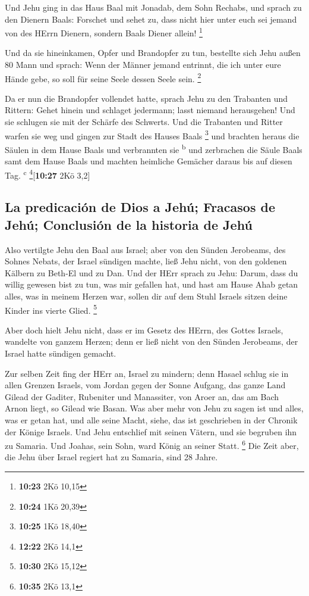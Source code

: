  Und Jehu ging in das Haus Baal mit Jonadab, dem Sohn
Rechabs, und sprach zu den Dienern Baals: Forschet und sehet zu, dass
nicht hier unter euch sei jemand von des HErrn Dienern, sondern Baals
Diener allein! \footnote{\textbf{10:23} 2Kö 10,15}

 Und da sie hineinkamen, Opfer und Brandopfer zu tun,
bestellte sich Jehu außen 80 Mann und sprach: Wenn der Männer jemand
entrinnt, die ich unter eure Hände gebe, so soll für seine Seele dessen
Seele sein. \footnote{\textbf{10:24} 1Kö 20,39}

 Da er nun die Brandopfer vollendet hatte, sprach Jehu zu
den Trabanten und Rittern: Gehet hinein und schlaget jedermann; lasst
niemand herausgehen! Und sie schlugen sie mit der Schärfe des Schwerts.
Und die Trabanten und Ritter warfen sie weg und gingen zur Stadt des
Hauses Baals \footnote{\textbf{10:25} 1Kö 18,40}  und
brachten heraus die Säulen in dem Hause Baals und verbrannten sie
\textsuperscript{b}  und zerbrachen die Säule Baals samt
dem Hause Baals und machten heimliche Gemächer daraus bis auf diesen
Tag. \textsuperscript{c} \footnote{\textbf{12:22} 2Kö 14,1}{[}\textbf{10:27}
2Kö 3,2{]}

\hypertarget{la-predicaciuxf3n-de-dios-a-jehuxfa-fracasos-de-jehuxfa-conclusiuxf3n-de-la-historia-de-jehuxfa}{%
\subsection{La predicación de Dios a Jehú; Fracasos de Jehú; Conclusión
de la historia de
Jehú}\label{la-predicaciuxf3n-de-dios-a-jehuxfa-fracasos-de-jehuxfa-conclusiuxf3n-de-la-historia-de-jehuxfa}}

 Also vertilgte Jehu den Baal aus Israel; 
aber von den Sünden Jerobeams, des Sohnes Nebats, der Israel sündigen
machte, ließ Jehu nicht, von den goldenen Kälbern zu Beth-El und zu Dan.
 Und der HErr sprach zu Jehu: Darum, dass du willig
gewesen bist zu tun, was mir gefallen hat, und hast am Hause Ahab getan
alles, was in meinem Herzen war, sollen dir auf dem Stuhl Israels sitzen
deine Kinder ins vierte Glied. \footnote{\textbf{10:30} 2Kö 15,12}

 Aber doch hielt Jehu nicht, dass er im Gesetz des HErrn,
des Gottes Israels, wandelte von ganzem Herzen; denn er ließ nicht von
den Sünden Jerobeams, der Israel hatte sündigen gemacht.

 Zur selben Zeit fing der HErr an, Israel zu mindern;
denn Hasael schlug sie in allen Grenzen Israels,  vom
Jordan gegen der Sonne Aufgang, das ganze Land Gilead der Gaditer,
Rubeniter und Manassiter, von Aroer an, das am Bach Arnon liegt, so
Gilead wie Basan.  Was aber mehr von Jehu zu sagen ist
und alles, was er getan hat, und alle seine Macht, siehe, das ist
geschrieben in der Chronik der Könige Israels.  Und Jehu
entschlief mit seinen Vätern, und sie begruben ihn zu Samaria. Und
Joahas, sein Sohn, ward König an seiner Statt. \footnote{\textbf{10:35}
  2Kö 13,1}  Die Zeit aber, die Jehu über Israel regiert
hat zu Samaria, sind 28 Jahre.

